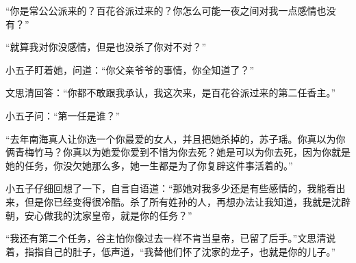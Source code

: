 “你是常公公派来的？百花谷派过来的？你怎么可能一夜之间对我一点感情也没有？”

“就算我对你没感情，但是也没杀了你对不对？”

小五子盯着她，问道：“你父亲爷爷的事情，你全知道了？”

文思清回答：“你都不敢跟我承认，我这次来，是百花谷派过来的第二任香主。”

小五子问：“第一任是谁？”

“去年南海真人让你选一个你最爱的女人，并且把她杀掉的，苏子瑶。你真以为你俩青梅竹马？你真以为她爱你爱到不惜为你去死？她是可以为你去死，因为你就是她的任务，你没欠她那么多，她一生都是为了你复辟这件事活着的。”

小五子仔细回想了一下，自言自语道：“那她对我多少还是有些感情的，我能看出来，但是你已经变得很冷酷。杀了所有姓孙的人，再想办法让我知道，我就是沈辟朝，安心做我的沈家皇帝，就是你的任务？”

“我还有第二个任务，谷主怕你像过去一样不肯当皇帝，已留了后手。”文思清说着，指指自己的肚子，低声道，“我替他们怀了沈家的龙子，也就是你的儿子。”

\newpage